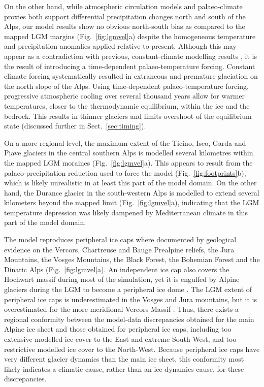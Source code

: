 \documentclass[tc, manuscript]{copernicus}
\begin{document}
    On the other hand, while atmospheric circulation models
    \citep{Strandberg.etal.2011, Ludwig.etal.2016} and palaeo-climate proxies
    \citep{Luetscher.etal.2015} both support differential precipitation changes
    north and south of the Alps, our model results show no obvious north-south
    bias as compared to the mapped LGM margins (Fig.~\ref{fig:lgmvel}a) despite
    the homogeneous temperature and precipitation anomalies applied relative to
    present. Although this may appear as a contradiction with previous,
    constant-climate modelling results \citep{Becker.etal.2016}, it is the
    result of introducing a time-dependent palaeo-temperature forcing. Constant
    climate forcing systematically resulted in extraneous
    \citep[Fig.~3]{Becker.etal.2016} and premature
    \citep[Fig.~4]{Becker.etal.2016} glaciation on the north slope of the Alps.
    Using time-dependent palaeo-temperature forcing, progressive atmospheric
    cooling over several thousand years allow for warmer temperatures, closer to
    the thermodynamic equilibrium, within the ice and the bedrock. This results
    in thinner glaciers and limits overshoot of the equilibrium state
    (discussed further in Sect.~\ref{sec:timing}).

    On a more regional level, the maximum extent of the Ticino, Iseo,
    Garda and Piave glaciers in the central southern Alps is modelled
    several kilometres within the mapped LGM moraines (Fig.~\ref{fig:lgmvel}a).
    This appears to result
    from the palaeo-precipitation reduction used to force the model
    (Fig.~\ref{fig:footprints}b), which is likely unrealistic in at least this
    part of the model domain. On the other hand, the Durance glacier in the
    south-western Alps is modelled to extend several kilometers beyond the
    mapped limit (Fig.~\ref{fig:lgmvel}a), indicating that the LGM temperature
    depression was likely
    dampened by Mediterranean climate in this part of the model domain.

    The model reproduces peripheral ice caps where documented by geological
    evidence on the Vercors, Chartreuse and Bauge Prealpine reliefs,
    the Jura Mountains, the Vosges Mountains, the Black Forest, the Bohemian
    Forest and the Dinaric Alps (Fig.~\ref{fig:lgmvel}a). An independent ice
    cap also covers the Hochwart massif during most of the simulation, yet it
    is engulfed by Alpine glaciers during the LGM to become a peripheral ice
    dome \citep[Fig.~\ref{fig:lgmvel}a; cf.][Fig.~2.5]{Husen.2011}. The LGM
    extent of peripheral ice caps is underestimated in the Vosges and Jura
    mountains, but it is overestimated for the more meridional Vercors Massif
    \citep[Fig.~\ref{fig:lgmvel}a; cf.][Figs.~4.28, 4.32, and 4.33,
    p.~322--321]{Coutterand.2010}. Thus, there exists a regional conformity
    between the model-data discrepancies obtained for the main Alpine ice sheet
    and those obtained for peripheral ice caps, including too extensive
    modelled ice cover to the East and extreme South-West, and too restrictive
    modelled ice cover to the North-West. Because peripheral ice caps have
    very different glacier dynamics than the main ice sheet, this conformity
    most likely indicates a climatic cause, rather than an ice dynamics cause,
    for these discrepancies.
\end{document}
